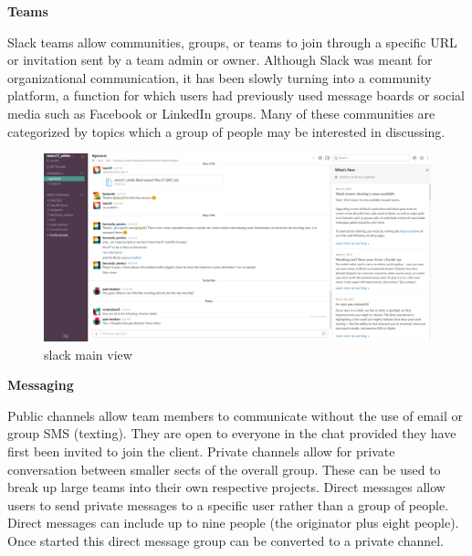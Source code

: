 \textbf{Teams
}

Slack teams allow communities, groups, or teams to join through a specific URL or invitation sent by a team admin or owner. Although Slack was meant for organizational communication, it has been slowly turning into a community platform, a function for which users had previously used message boards or social media such as Facebook or LinkedIn groups. Many of these communities are categorized by topics which a group of people may be interested in discussing.
\begin{figure}[h]
	\centering
	\caption{slack main view}
	\includegraphics[width=\textwidth]{images/slackmainview.png}
\end{figure}
\textbf{Messaging}

Public channels allow team members to communicate without the use of email or group SMS (texting). They are open to everyone in the chat provided they have first been invited to join the client. Private channels allow for private conversation between smaller sects of the overall group. These can be used to break up large teams into their own respective projects. Direct messages allow users to send private messages to a specific user rather than a group of people. Direct messages can include up to nine people (the originator plus eight people). Once started this direct message group can be converted to a private channel.